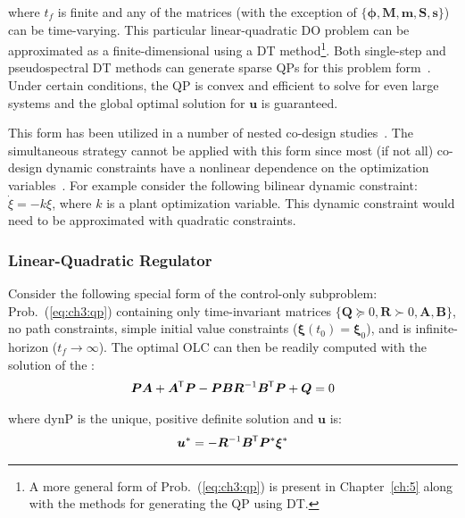 \noindent where $t_f$ is finite and any of the matrices (with the exception of $\{\bm{\phi}, \bm{M}, \bm{m}, \bm{S}, \bm{s}\}$) can be time-varying.
This particular linear-quadratic DO problem can be approximated as a finite-dimensional  using a DT method\footnote{A more general form of Prob.~(\ref{eq:ch3:qp}) is present in Chapter~\ref{ch:5} along with the methods for generating the QP using DT.}. Both single-step and pseudospectral DT methods can generate sparse QPs for this problem form~\cite{Herber2014a, Biegler2010a}.
Under certain conditions, the QP is convex and efficient to solve for even large systems and the global optimal solution for $\bm{u}$ is guaranteed.

This form has been utilized in a number of nested co-design studies~\cite{Herber2014a, Chilan2017a}.
The simultaneous strategy cannot be applied with this form since most (if not all) co-design dynamic constraints have a nonlinear dependence on the optimization variables~\cite{Fathy2001a}. For example consider the following bilinear dynamic constraint: $\dot{\xi} = - k \xi$, where $k$ is a plant optimization variable. This dynamic constraint would need to be approximated with quadratic constraints.

\subsubsection{Linear-Quadratic Regulator \label{sec:ch3:lqr}}

Consider the following special form of the control-only subproblem: Prob.~(\ref{eq:ch3:qp}) containing only time-invariant matrices $\{ {\bm{Q}} \succeq 0, {\bm{R}} \succ 0, {\bm{A}}, {\bm{B}} \}$, no path constraints, simple initial value constraints ($\bm{\xi}(t_0) = \bm{\xi}_0$), and is infinite-horizon ($t_f \to \infty$). The optimal OLC can then be readily computed with the solution of the :
\begin{align}
\label{eq:ch3:are}
\bm{P} {\bm{A}} + {\bm{A}}^{\mkern-1.5mu\mathsf{T}} \bm{P} - \bm{P} {\bm{B}} {\bm{R}}^{-1} {\bm{B}}^{\mkern-1.5mu\mathsf{T}} \bm{P} + {\bm{Q}} = 0
\end{align}

\noindent where \gls{dynP} is the unique, positive definite solution and $\bm{u}$ is:
\begin{align}
\bm{u}^* = - {\bm{R}}^{-1} {\bm{B}}^{\mkern-1.5mu\mathsf{T}} \bm{P}^* \bm{\xi}^*
\end{align}

